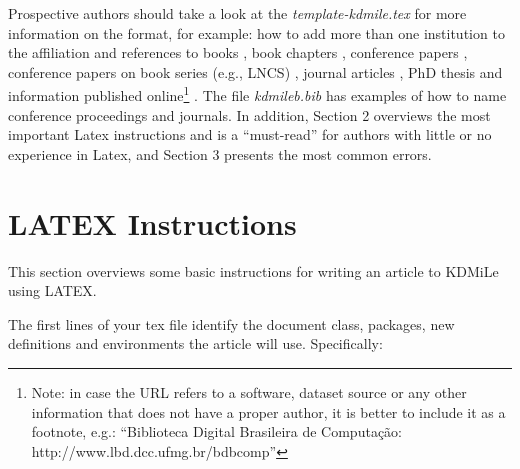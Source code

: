 \documentclass[kdmile,a4paper]{kdmile} %
\begin{document}
Prospective authors should take a look at the \textit{template-kdmile.tex} for more information on the format, for example: how to add more than one institution to the affiliation and  references to books \cite{Baeza-YatesR99}, book chapters \cite{BorgidaCL09}, conference papers \cite{FerreiraGALV09}, conference papers on book series (e.g., LNCS) \cite{SilvaLC96}, journal articles \cite{LaenderMNM09}, PhD thesis \cite{Moro07} and information published online\footnote{Note: in case the URL refers to a software, dataset source or any other information that does not have a proper author, it is better to include it as a footnote, e.g.: ``Biblioteca Digital Brasileira de Computa\c{c}\~{a}o: http://www.lbd.dcc.ufmg.br/bdbcomp''} \cite{xpath}. The file \textit{kdmileb.bib} has examples of how to name conference proceedings and journals. In addition, Section 2 overviews the most important Latex instructions and is a ``must-read'' for authors with little or no experience in Latex, and Section 3 presents the most common errors.


\section{LATEX Instructions}

This section overviews some basic instructions for writing an article to KDMiLe using LATEX.


The first lines of your tex file identify the document class, packages, new definitions and environments the article will use.
Specifically:
\end{document}

